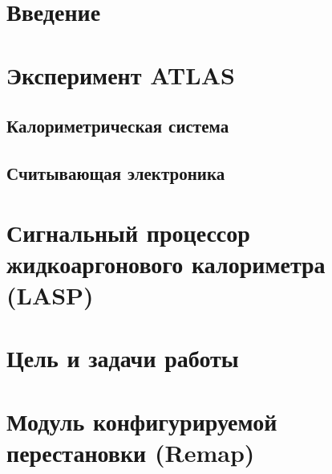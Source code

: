 \documentclass[a4paper, 14pt]{extarticle}
\begin{document}


\tableofcontents
\thispagestyle{empty}
\newpage

\setcounter{page}{3}
\section*{Введение}
    
    \newpage

\section{Эксперимент ATLAS}
    
    \subsection{Калориметрическая система}
    
    \subsection{Считывающая электроника}
    
    \newpage

\section{Сигнальный процессор жидкоаргонового калориметра (LASP)}
    
%    
    \newpage

%    

\section{Цель и задачи работы}
%    
    \newpage

\section{Модуль конфигурируемой перестановки (Remap)}
    
\end{document}
